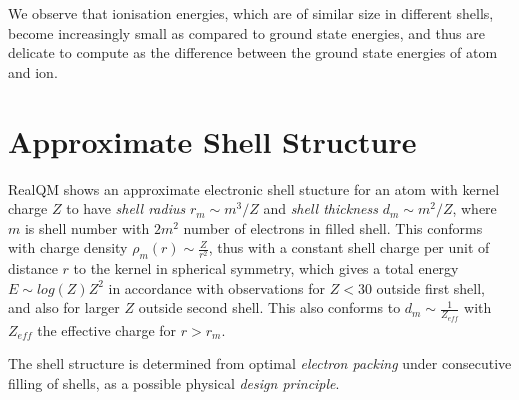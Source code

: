 \documentclass[11pt]{article} %
\begin{document}
We observe that ionisation energies,  which are of similar size in different shells,  become increasingly small as compared to ground state energies,  and thus are delicate to compute as the difference between the ground state energies of atom and ion.

\section{Approximate Shell Structure}
RealQM shows an approximate electronic shell stucture for an atom with kernel charge $Z$ to have \emph{shell radius} $r_m\sim m^3/Z$ and \emph{shell thickness} $d_m\sim m^2/Z$,  where $m$ is shell number with $2m^2$ number of electrons in filled shell.  This conforms with charge density $\rho_m(r)\sim\frac{Z}{r^2}$,  thus with a constant shell charge per unit of distance $r$ to the kernel in spherical symmetry,  which gives a total energy $E\sim log(Z)Z^2$ in accordance with observations for $Z<30$ outside first shell,  and also for larger $Z$ outside second shell.  This also conforms to $d_m\sim \frac{1}{Z_{eff}}$ with $Z_{eff}$ the effective charge for $r>r_m$.  

The shell structure is determined from optimal \emph{electron packing} under consecutive filling of shells,  as a possible physical \emph{design principle}. 


\end{document}
